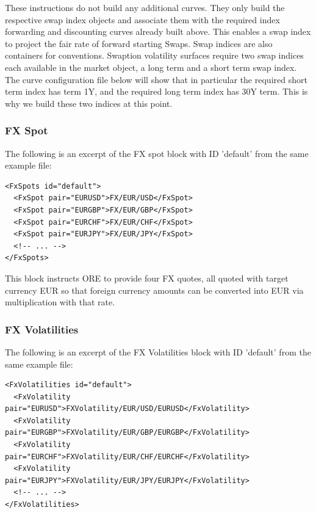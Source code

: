 These instructions do not build any additional curves. They only build the respective swap index objects and associate
them with the required index forwarding and discounting curves already built above. This enables a swap index to project
the fair rate of forward starting Swaps. Swap indices are also containers for conventions. Swaption volatility surfaces
require two swap indices each available in the market object, a long term and a short term swap index. The curve
configuration file below will show that in particular the required short term index has term 1Y, and the required long
term index has 30Y term. This is why we build these two indices at this point.

\subsubsection{FX Spot}

The following is an excerpt of the FX spot block with ID 'default' from the same example file:

\begin{listing}[H]
\begin{verbatim}
<FxSpots id="default">
  <FxSpot pair="EURUSD">FX/EUR/USD</FxSpot>
  <FxSpot pair="EURGBP">FX/EUR/GBP</FxSpot>
  <FxSpot pair="EURCHF">FX/EUR/CHF</FxSpot>
  <FxSpot pair="EURJPY">FX/EUR/JPY</FxSpot>
  <!-- ... -->
</FxSpots>
\end{verbatim}
\caption{FX spot block with ID 'default'}
\label{lst:fxspot_spec}
\end{listing}

This block instructs ORE to provide four FX quotes, all quoted with target currency EUR so
that foreign currency amounts can be converted into EUR via multiplication with that rate.
 
\subsubsection{FX Volatilities}

The following is an excerpt of the FX Volatilities block with ID 'default' from the same example file:

\begin{listing}[H]
\begin{verbatim}
<FxVolatilities id="default">
  <FxVolatility pair="EURUSD">FXVolatility/EUR/USD/EURUSD</FxVolatility>
  <FxVolatility pair="EURGBP">FXVolatility/EUR/GBP/EURGBP</FxVolatility>
  <FxVolatility pair="EURCHF">FXVolatility/EUR/CHF/EURCHF</FxVolatility>
  <FxVolatility pair="EURJPY">FXVolatility/EUR/JPY/EURJPY</FxVolatility>
  <!-- ... -->
</FxVolatilities>
\end{verbatim}
\caption{FX volatility block with ID 'default'}
\label{lst:fxvol_spec}
\end{listing}

